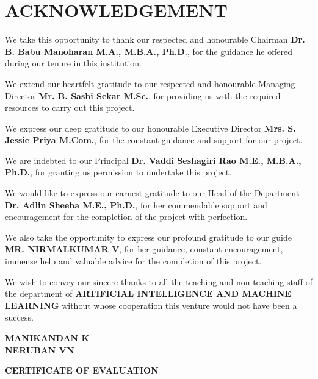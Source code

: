 \documentclass[12pt,a4paper]{report}
\begin{document}
\chapter*{ACKNOWLEDGEMENT}

We take this opportunity to thank our respected and honourable Chairman \textbf{Dr. B. Babu Manoharan M.A., M.B.A., Ph.D.}, for the guidance he offered during our tenure in this institution.

We extend our heartfelt gratitude to our respected and honourable Managing Director \textbf{Mr. B. Sashi Sekar M.Sc.}, for providing us with the required resources to carry out this project.

We express our deep gratitude to our honourable Executive Director \textbf{Mrs. S. Jessie Priya M.Com.}, for the constant guidance and support for our project.

We are indebted to our Principal \textbf{Dr. Vaddi Seshagiri Rao M.E., M.B.A., Ph.D.}, for granting us permission to undertake this project.

We would like to express our earnest gratitude to our Head of the Department \textbf{Dr. Adlin Sheeba M.E., Ph.D.}, for her commendable support and encouragement for the completion of the project with perfection.

We also take the opportunity to express our profound gratitude to our guide \textbf{MR. NIRMALKUMAR V}, for her guidance, constant encouragement, immense help and valuable advice for the completion of this project.

We wish to convey our sincere thanks to all the teaching and non-teaching staff of the department of \textbf{ARTIFICIAL INTELLIGENCE AND MACHINE LEARNING} without whose cooperation this venture would not have been a success.

\vspace{2cm}
\begin{flushright}
\textbf{MANIKANDAN K}\\[4pt]
\textbf{NERUBAN VN}
\end{flushright}

\newpage
\thispagestyle{empty}
\begin{center}
  \textbf{\Large CERTIFICATE OF EVALUATION}
\end{center}
\end{document}
